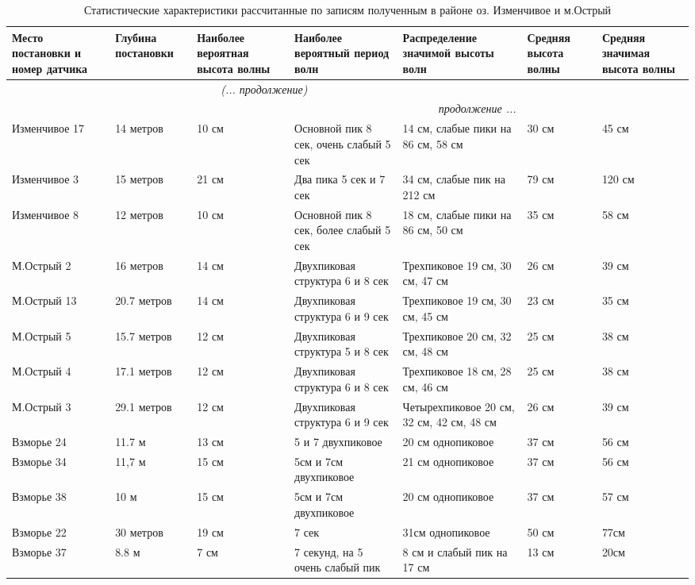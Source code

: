 \begin{longtable}{|X |X |X |X| X| X| X|}
\caption{Статистические характеристики рассчитанные по записям полученным в районе оз. Изменчивое и м.Острый}\label{tbl:charact}\\
    \hline
        \textbf{Место постановки и номер датчика} & \textbf{Глубина постановки} & \textbf{Наиболее вероятная высота волны } & \textbf{Наиболее вероятный период волн} & \textbf{Распреде\-ление значимой высоты волн} & \textbf{Средняя высота волны } & \textbf{Средняя значимая высота волны } \\
    \hline
        \endfirsthead
    \hline
        \multicolumn{5}{c}{\small\slshape (... продолжение)} \\
    \hline
        \endhead
    \hline
        \multicolumn{5}{|r|}{\small\slshape продолжение ...}  \\
    \hline
        \endfoot
    \hline
        \endlastfoot
    \hline
Изменчивое 17 & 14  метров & 10 см & Основной пик 8 сек, очень слабый 5 сек & 14 см, слабые пики на 86 см, 58 см  & 30 см & 45 см \\
\hline
Изменчивое 3 & 15 метров & 21 см & Два пика 5 сек и 7 сек & 34 см, слабые пик на 212 см & 79 см & 120 см \\
\hline
Изменчивое 8 & 12 метров & 10 см & Основной пик 8 сек, более слабый 5 сек & 18 см, слабые пики на 86 см, 50 см & 35 см & 58 см \\
\hline
М.Острый 2  & 16 метров & 14 см  & Двухпиковая структура 6 и 8 сек & Трехпиковое 19 см, 30 см, 47 см & 26 см  & 39 см  \\
\hline
М.Острый 13  & 20.7 метров & 14 см  & Двухпиковая структура 6 и 9 сек & Трехпиковое 19 см, 30 см, 45 см & 23 см  & 35 см  \\
\hline
М.Острый 5  & 15.7 метров & 12 см  & Двухпиковая структура 5 и 8 сек & Трехпиковое 20 см, 32 см, 48 см & 25 см  & 38 см  \\
\hline
М.Острый 4  & 17.1 метров & 12 см  & Двухпиковая структура 6 и 8 сек & Трехпиковое 18 см, 28 см, 46 см & 25 см  & 38 см  \\
\hline
М.Острый 3  & 29.1 метров & 12 см  & Двухпиковая структура 6 и 9 сек & Четырехпиковое 20 см, 32 см, 42 см, 48 см & 26 см  & 39 см  \\
\hline
Взморье 24  & 11.7 м & 13 см  & 5 и 7 двухпиковое & 20 см однопиковое & 37 см  & 56 см  \\
\hline
Взморье 34  & 11,7 м & 15 см  & 5см и 7см двухпиковое & 21 см однопиковое & 37 см  & 56 см  \\
\hline
Взморье 38  & 10 м & 15 см  & 5см и 7см двухпиковое & 20 см однопиковое & 37 см  & 57 см \\
\hline
Взморье 22  & 30 метров & 19 см  & 7 сек & 31см однопиковое & 50 см  & 77см  \\
\hline
Взморье 37  & 8.8 м & 7 см  & 7 секунд, на 5 очень слабый пик & 8 см и слабый пик на 17 см  & 13 см  & 20см  \\
\hline
\end{longtable}
